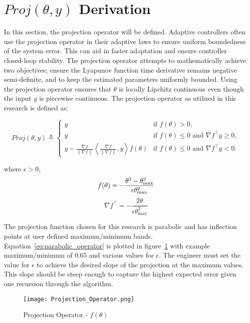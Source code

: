\section{$Proj(\theta,y)$ Derivation}

In this section, the projection operator will be defined.  Adaptive controllers often use the projection operator in their adaptive laws to ensure uniform boundedness of the system error.  This can aid in faster adaptation and ensure controller closed-loop stability.  The projection operator attempts to mathematically achieve two objectives; ensure the Lyapunov function time derivative remains negative semi-definite, and to keep the estimated parameters uniformly bounded.  Using the projection operator ensures that $\theta$ is locally Lipchitz continuous even though the input $y$ is piecewise continuous.  The projection operator as utilized in this research is defined as:

\begin{equation}
Proj(\theta,y)\triangleq 	
	\begin{cases}
	y& \text{if }f(\theta)>0, \\
	y& \text{if }f(\theta) \leq 0\text{ and }\nabla f^\top y\geq 0,\\
	y-\frac{\nabla f}{\|\nabla f\|}\left\langle\frac{\nabla f}{\|\nabla f\|},y\right\rangle f(\theta)& \text{if }f(\theta)\leq 0\text{ and }\nabla f^\top y< 0.
	\end{cases}	
\end{equation}

where $\epsilon>0$,
\begin{equation}\label{eq:parabolic_operator}
	f(\theta)=-\frac{\theta^2-\theta_{\text{max}}^2}{\epsilon \theta_{\text{max}}^2}\\
\end{equation}
\begin{equation}
	\nabla f^\top=-\frac{2\theta}{\epsilon \theta_{\text{max}}^2}
\end{equation}

The projection function chosen for this research is parabolic and has inflection points at user defined maximum/minimum bands.  Equation~\ref{eq:parabolic_operator} is plotted in figure~\ref{fig:projection_operator} with example maximum/minimum of $0.65$ and various values for $\epsilon$.  The engineer must set the value for $\epsilon$ to achieve the desired slope of the projection at the maximum values.  This slope should be steep enough to capture the highest expected error given one recursion through the algorithm.
\begin{figure}[h!]
 \centering
  \texttt{[image: Projection\_Operator.png]}
  \caption{Projection Operator - $f(\theta)$}
  \label{fig:projection_operator}
\end{figure}

